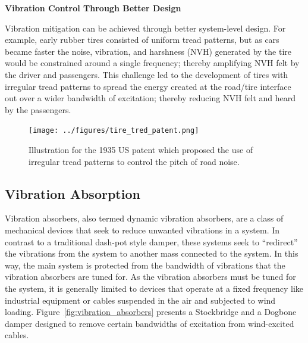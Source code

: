 \documentclass[12pt,letter]{article}
\begin{document}

\pagebreak
		\begin{vibration_case_study}

		\textbf{Vibration Control Through Better Design}
	
	\noindent Vibration mitigation can be achieved through better system-level design. For example, early rubber tires consisted of uniform tread patterns, but as cars became faster the noise, vibration, and harshness (NVH) generated by the tire would be constrained around a single frequency; thereby amplifying NVH felt by the driver and passengers. This challenge led to the development of tires with irregular tread patterns to spread the energy created at the road/tire interface out over a wider bandwidth of excitation; thereby reducing NVH felt and heard by the passengers.   
		
	\begin{figure}[H]
		\vspace{-2ex}
		\centering
		\texttt{[image: ../figures/tire\_tred\_patent.png]}
		\vspace{-3ex}
		\caption{Illustration for the 1935 US patent which proposed the use of irregular tread patterns to control the pitch of road noise\protect\footnotemark[1].}
	\end{figure}	
\end{vibration_case_study}










\subsection{Vibration Absorption}

Vibration absorbers, also termed dynamic vibration absorbers, are a class of mechanical devices that seek to reduce unwanted vibrations in a system. In contrast to a traditional dash-pot style damper, these systems seek to ``redirect'' the vibrations from the system to another mass connected to the system. In this way, the main system is protected from the bandwidth of vibrations that the vibration absorbers are tuned for. As the vibration absorbers must be tuned for the system, it is generally limited to devices that operate at a fixed frequency like industrial equipment or cables suspended in the air and subjected to wind loading. Figure~\ref{fig:vibration_absorbers} presents a Stockbridge and a Dogbone damper designed to remove certain bandwidths of excitation from wind-excited cables.
\end{document}
